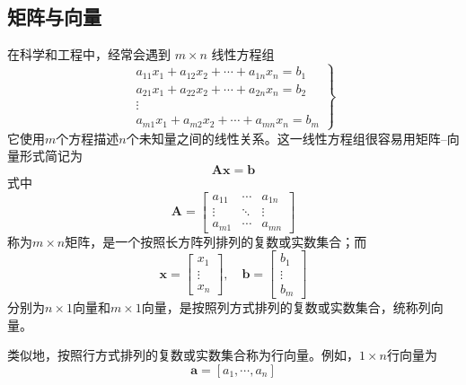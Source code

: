 \documentclass[punct=kaiming, fontset=fandol]{ctexbook}
\numberwithin{equation}{section}
\theoremstyle{mystyle}
\def\bf#1{\symbfit{#1}}
\def\bf#1{\bm{#1}}
\begin{document}
  \subsection{矩阵与向量}
  在科学和工程中，经常会遇到 $m \times n$ 线性方程组
  \begin{equation}
    \left.
    \begin{array}{c}
      a_{11} x_1 + a_{12} x_2 + \cdots + a_{1n} x_n = b_1\\
      a_{21} x_1 + a_{22} x_2 + \cdots + a_{2n} x_n = b_2\\
      \vdots\\
      a_{m1} x_1 + a_{m2} x_2 + \cdots + a_{mn} x_n = b_m
    \end{array}
    \right\}
  \end{equation}
  它使用$m$个方程描述$n$个未知量之间的线性关系。这一线性方程组很容易用矩阵--向量形式简记为
  \begin{equation}
    \bf A \bf{x} = \bf{b}
  \end{equation}
  式中
  \begin{equation}
    \bf A = \begin{bmatrix}
      a_{11} & \cdots & a_{1n} \\
      \vdots & \ddots & \vdots \\
      a_{m1} & \cdots & a_{mn}
    \end{bmatrix}
  \end{equation}
  称为$m\times n$矩阵，是一个按照长方阵列排列的复数或实数集合；而
  \begin{equation}
    \bf{x} = \begin{bmatrix}
      x_1 \\ \vdots \\ x_n
    \end{bmatrix}, \quad
    \bf{b} = \begin{bmatrix}
      b_1 \\ \vdots \\ b_m
    \end{bmatrix}
  \end{equation}
  分别为$n\times 1$向量和$m\times 1$向量，是按照列方式排列的复数或实数集合，统称列向量。

  类似地，按照行方式排列的复数或实数集合称为行向量。例如，$1\times n$行向量为
  \begin{equation}
    \bf{a} = [a_1,\cdots,a_n]
  \end{equation}
\end{document}
